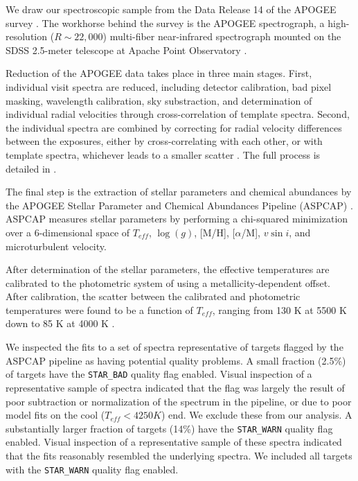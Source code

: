 \documentclass[manuscript]{aastex6}
\newcommand{\vsini}{\ensuremath{v \sin i}}
\newcommand{\Teff}{\ensuremath{T_{eff}}}
\newcommand{\logg}{\ensuremath{\log(g)}}
\newcommand{\STARBAD}{\texttt{STAR\_BAD}}
\newcommand{\STARWARN}{\texttt{STAR\_WARN}}
\begin{document}
We draw our spectroscopic sample from the Data Release 14 \citep{Abolfathi18}
of the APOGEE survey \citep{Majewski17}. The workhorse behind the survey is the
APOGEE spectrograph, a high-resolution (\(R \sim 22,000\)) multi-fiber
near-infrared spectrograph \citep{Wilson10} mounted on the SDSS 2.5-meter
telescope at Apache Point Observatory \citep{Gunn06}.

Reduction of the APOGEE data takes place in three main stages. First,
individual visit spectra are reduced, including detector calibration, bad pixel
masking, wavelength calibration, sky substraction, and determination of
individual radial velocities through cross-correlation of template spectra.
Second, the individual spectra are combined by correcting for radial velocity
differences between the exposures, either by cross-correlating with each other,
or with template spectra, whichever leads to a smaller scatter
\citep{Holtzman18}. The full process is detailed in \citet{Nidever15}.

The final step is the extraction of stellar parameters and chemical abundances
by the APOGEE Stellar Parameter and Chemical Abundances Pipeline (ASPCAP)
\citep{GarciaPerez16}. ASPCAP measures stellar parameters by performing a
chi-squared minimization \citep{AllendePrieto06} over a 6-dimensional space of
\Teff, \logg, [M/H], [\(\alpha\)/M], \vsini, and microturbulent velocity.

After determination of the stellar parameters, the effective temperatures are 
calibrated to the photometric system of \citet{GonzalezHernandez09} using a 
metallicity-dependent offset. After calibration, the scatter between the 
calibrated and photometric temperatures  were found to be a function of 
\Teff{}, ranging from 130 K at 5500 K down to 85 K at 4000 K
\citep{Holtzman18}.

We inspected the fits to a set of spectra representative of targets flagged 
by the ASPCAP pipeline as having potential quality problems. A small fraction
(2.5\%) of targets have the \STARBAD{} quality flag enabled. Visual inspection
of a representative sample of spectra indicated that the flag was largely the
result of poor subtraction or normalization of the spectrum in the pipeline, or
due to poor model fits on the cool (\(\Teff < 4250 K\)) end. We exclude these
from our analysis. A substantially larger fraction of targets (14\%) have the 
\STARWARN{} quality flag enabled. Visual inspection of a representative sample 
of these spectra indicated that the fits reasonably resembled the underlying 
spectra. We included all targets with the \STARWARN{} quality flag enabled.
\end{document}
